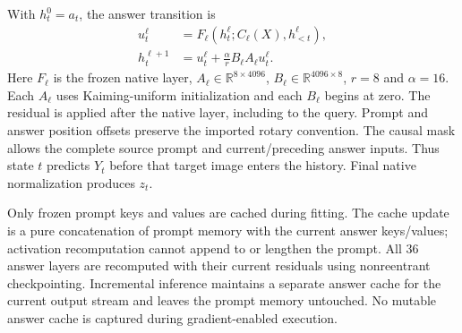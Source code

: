 \documentclass[12pt,a4paper]{article}
\providecommand{\DIFadd}[1]{{\protect\color{blue} \sf #1}} %
\begin{document}
\DIFadd{With $h^0_t=a_t$, the answer transition is
}\begin{align}
 u^\ell_t&=F_\ell(h^\ell_t;C_\ell(X),h^\ell_{<t}),\nonumber\\
 h^{\ell+1}_t&=u^\ell_t+\frac{\alpha}{r}B_\ell A_\ell u^\ell_t.
 \label{eq:continuation-residual}
\end{align}
\DIFadd{Here $F_\ell$ is the frozen native layer,
$A_\ell\in\mathbb R^{8\times4096}$,
$B_\ell\in\mathbb R^{4096\times8}$, $r=8$ and $\alpha=16$.
Each $A_\ell$ uses Kaiming-uniform initialization and each $B_\ell$ begins at
zero. The residual is applied after the native layer, including to the query.
Prompt and answer position offsets preserve the imported rotary convention.
The causal mask allows the complete source prompt and current/preceding answer
inputs. Thus state $t$ predicts $Y_t$ before that target image enters the history.
Final native normalization produces $z_t$.
}

\DIFadd{Only frozen prompt keys and values are cached during fitting. The cache update
is a pure concatenation of prompt memory with the current answer keys/values;
activation recomputation cannot append to or lengthen the prompt. All 36 answer
layers are recomputed with their current residuals using nonreentrant
checkpointing. Incremental inference maintains a separate answer cache for
the current output stream and leaves the prompt memory untouched. No mutable
answer cache is captured during gradient-enabled execution.
}
\end{document}
